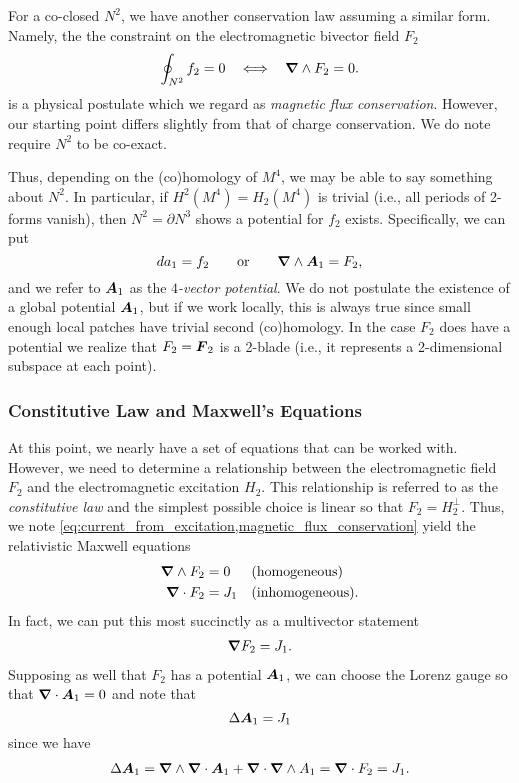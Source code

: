 \documentclass[conf]{new-aiaa}
\begin{document}
For a co-closed $N^2$, we have another conservation law assuming a similar form. Namely, the the constraint on the electromagnetic bivector field $F_2$
\begin{equation}
    \label{eq:magnetic_flux_conservation}
    \oint_{N^2} f_2 = 0  ~~\iff~~ \boldsymbol{\nabla} \wedge F_2=0.
\end{equation}
is a physical postulate which we regard as \emph{magnetic flux conservation}. However, our starting point differs slightly from that of charge conservation. We do note require $N^2$ to be co-exact. 

Thus, depending on the (co)homology of $M^4$, we may be able to say something about $N^2$. In particular, if $H^2(M^4)=H_2(M^4)$ is trivial (i.e., all periods of 2-forms vanish), then $N^2=\partial N^3$ shows a potential for $f_2$ exists. Specifically, we can put
\begin{equation}
da_1 = f_2 \qquad \textrm{or} \qquad \boldsymbol{\nabla} \wedge \boldsymbol{A}_1 = F_2,
\end{equation}
and we refer to $\boldsymbol{A}_1$ as the \emph{$4$-vector potential}. We do not postulate the existence of a global potential $\boldsymbol{A}_1$, but if we work locally, this is always true since small enough local patches have trivial second (co)homology. In the case $F_2$ does have a potential we realize that $F_2=\boldsymbol{F}_2$ is a 2-blade (i.e., it represents a 2-dimensional subspace at each point).

\subsubsection{Constitutive Law and Maxwell's Equations}

At this point, we nearly have a set of equations that can be worked with. However, we need to determine a relationship between the electromagnetic field $F_2$ and the electromagnetic excitation $H_2$. This relationship is referred to as the \emph{constitutive law} and the simplest possible choice is linear so that $F_2 = H_2^\perp$. Thus, we note \cref{eq:current_from_excitation,magnetic_flux_conservation} yield the relativistic Maxwell equations
\begin{align}
	\boldsymbol{\nabla} \wedge F_2 &= 0  &&\textrm{(homogeneous)}\\
	\boldsymbol{\nabla} \cdot F_2 &= J_1 && \textrm{(inhomogeneous)}.
\end{align}
In fact, we can put this most succinctly as a multivector statement
\begin{align}
	\boldsymbol{\nabla} F_2 = J_1.
\end{align}
Supposing as well that $F_2$ has a potential $\boldsymbol{A}_1$, we can choose the Lorenz gauge so that $\boldsymbol{\nabla} \cdot \boldsymbol{A}_1 = 0$ and note that 
\begin{equation}
\Delta \boldsymbol{A}_1 = J_1
\end{equation}
since we have
\begin{align}
\Delta \boldsymbol{A}_1 = \boldsymbol{\nabla} \wedge \boldsymbol{\nabla} \cdot \boldsymbol{A}_1 + \boldsymbol{\nabla} \cdot \boldsymbol{\nabla} \wedge {A}_1= \boldsymbol{\nabla} \cdot F_2 = J_1.
\end{align}
\end{document}
